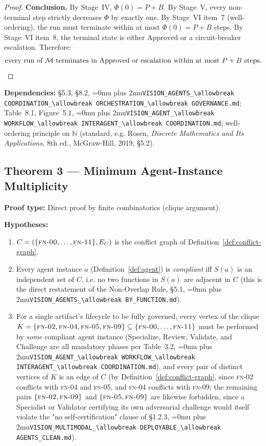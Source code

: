 \documentclass[12pt]{article}
\theoremstyle{definition}
\DeclareRobustCommand{\code}[1]{\begingroup\Urlmuskip=0mu plus 2mu\relax\nolinkurl{#1}\endgroup}
\newcommand{\FN}[1]{\textsc{fn-#1}}
\newcommand{\VisionClean}{\code{VISION\_MULTIMODAL\_\allowbreak DEPLOYABLE\_\allowbreak AGENTS\_CLEAN.md}}
\newcommand{\VisionGov}{\code{VISION\_AGENTS\_\allowbreak COORDINATION\_\allowbreak ORCHESTRATION\_\allowbreak GOVERNANCE.md}}
\newcommand{\VisionFunc}{\code{VISION\_AGENTS\_\allowbreak BY\_FUNCTION.md}}
\newcommand{\VisionFlow}{\code{VISION\_AGENT\_\allowbreak WORKFLOW\_\allowbreak INTERAGENT\_\allowbreak COORDINATION.md}}
\begin{document}
\begin{proof}
\medskip
\noindent\textbf{Conclusion.}
By Stage~IV, $\Phi(0) = P + B$.  By Stage~V, every non-terminal step
strictly decreases $\Phi$ by exactly one.  By Stage~VI item~7
(well-ordering), the run must terminate within at most $\Phi(0) = P + B$
steps.  By Stage~VI item~8, the terminal state is either
$\mathrm{Approved}$ or a circuit-breaker escalation.  Therefore:
\begin{equation}
  \label{eq:conclusion}
  \text{every run of } \mathcal{M}
  \text{ terminates in } \mathrm{Approved}
  \text{ or escalation within at most } P + B
  \text{ steps.} \qedhere
\end{equation}
\end{proof}

\begin{sloppypar}
\textbf{Dependencies:} \S5.3, \S8.2,
\VisionGov{}; Table~8.1,
Figure~5.1, \VisionFlow{};
well-ordering principle on $\mathbb{N}$ (standard, e.g. Rosen,
\emph{Discrete Mathematics and Its Applications}, 8th ed., McGraw-Hill,
2019, \S5.2).
\end{sloppypar}

\subsection{Theorem 3 --- Minimum Agent-Instance Multiplicity}

\textbf{Proof type:} Direct proof by finite combinatorics (clique
argument).

\textbf{Hypotheses:}
\begin{enumerate}
    \item[H1] $C = (\{\FN{00},\ldots,\FN{11}\}, E_C)$ is the conflict
              graph of Definition~\ref{def:conflict-graph}.
    \item[H2] Every agent instance $a$ (Definition~\ref{def:agent}) is
              \emph{compliant} iff $S(a)$ is an independent set of $C$,
              i.e. no two functions in $S(a)$ are adjacent in $C$ (this is
              the direct restatement of the Non-Overlap Rule, \S5.1,
              \VisionFunc{}).
    \item[H3] For a single artifact's lifecycle to be fully governed, every
              vertex of the clique
              $K = \{\FN{02},\FN{04},\FN{05},\FN{09}\} \subseteq
              \{\FN{00},\ldots,\FN{11}\}$ must be performed by
              \emph{some} compliant agent instance (Specialize, Review,
              Validate, and Challenge are all mandatory phases per
              Table~3.2, \VisionFlow{}), and every pair of distinct vertices
              of $K$ is an edge of $C$ (by Definition~\ref{def:conflict-graph},
              since \FN{02} conflicts with \FN{04} and \FN{05}, and
              \FN{04} conflicts with \FN{09}; the remaining pairs
              $\{\FN{02},\FN{09}\}$ and $\{\FN{05},\FN{09}\}$ are likewise
              forbidden, since a Specialist or Validator certifying its own
              adversarial challenge would itself violate the "no
              self-certification" clause of \S1.2.3,
              \VisionClean{}).
\end{enumerate}
\end{document}
